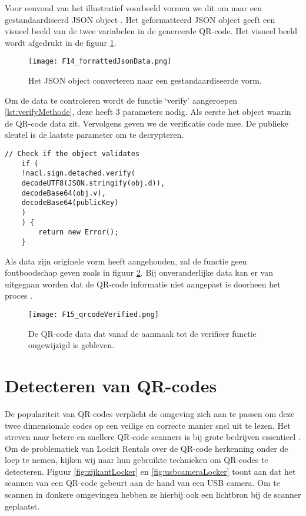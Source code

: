 Voor eenvoud van het illustratief voorbeeld vormen we dit om naar een gestandaardiseerd \ac{JSON} object \autocite{Concept}. Het geformatteerd \ac{JSON} object geeft een visueel beeld van de twee variabelen in de genereerde QR-code. Het visueel beeld wordt afgedrukt in de figuur \ref{fig:formattedJsonData}.

\begin{figure}[h]
    \centering
    \texttt{[image: F14\_formattedJsonData.png]}
    \captionsetup{justification=centering, singlelinecheck=false}
    \caption{Het JSON object converteren naar een gestandaardiseerde vorm.}
    \label{fig:formattedJsonData}
\end{figure}

\newpage
Om de data te controleren wordt de functie ‘verify’ aangeroepen \ref{lst:verifyMethode}, deze heeft 3 parameters nodig. Als eerste het object waarin de QR-code data zit. Vervolgens geven we de verificatie code mee. De publieke sleutel is de laatste parameter om te decrypteren.


\begin{lstlisting}[caption={De controle van QR-code data met de TweetNaCL.js verifieer functie.}, label={lst:verifyMethode}]
    // Check if the object validates
    if (
    !nacl.sign.detached.verify(
    decodeUTF8(JSON.stringify(obj.d)),
    decodeBase64(obj.v),
    decodeBase64(publicKey)
    )
    ) {
        return new Error();
    }
\end{lstlisting}

Als data zijn originele vorm heeft aangehouden, zal de functie geen foutboodschap geven zoals in figuur \ref{fig:qrdataVerified}. Bij onveranderlijke data kan er van uitgegaan worden dat de QR-code informatie niet aangepast is doorheen het proces \autocite{Bernsteinb}. 

\begin{figure}[h]
    \centering
    \texttt{[image: F15\_qrcodeVerified.png]}
    \captionsetup{justification=centering, singlelinecheck=false}
    \caption{De QR-code data dat vanaf de aanmaak tot de verifieer  functie ongewijzigd is gebleven.}
    \label{fig:qrdataVerified}
\end{figure}

\newpage

\section{Detecteren van QR-codes}
\label{sec:detecterenQr-codes}

De populariteit van QR-codes verplicht de omgeving zich aan te passen om deze twee dimensionale codes op een veilige en correcte manier snel uit te lezen. Het streven naar betere en snellere QR-code scanners is bij grote bedrijven essentieel \autocite{Ertekin2015}.
Om de problematiek van Lockit Rentals over de QR-code herkenning onder de loep te nemen, kijken wij naar hun gebruikte technieken om QR-codes te detecteren. Figuur \ref{fig:zijkantLocker} en \ref{fig:usbcameraLocker} toont aan dat het scannen van een QR-code gebeurt aan de hand van een USB camera. Om te scannen in donkere omgevingen hebben ze hierbij ook een lichtbron bij de scanner geplaatst.

